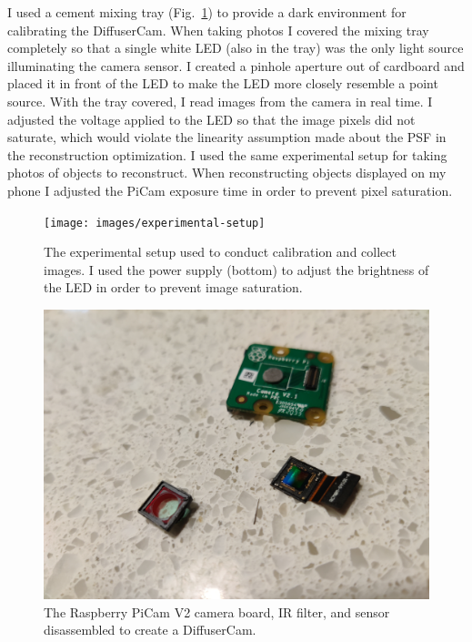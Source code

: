\documentclass[final]{cvpr}
\begin{document}
I used a cement mixing tray (Fig.~\ref{fig:experimental-setup}) to provide
a dark environment for calibrating the DiffuserCam.
When taking photos I covered the mixing tray completely so that a single white
LED (also in the tray) was the only light source illuminating the camera
sensor.
I created a pinhole aperture out of cardboard and placed it in front of the LED
to make the LED more closely resemble a point source.
With the tray covered, I read images from the camera in real time.
I adjusted the voltage applied to the LED so that the image pixels did not
saturate, which would violate the linearity assumption made about the PSF in
the reconstruction optimization.
I used the same experimental setup for taking photos of objects to reconstruct.
When reconstructing objects displayed on my phone I adjusted the PiCam exposure
time in order to prevent pixel saturation.


\begin{figure}[t]
	\centering
	\texttt{[image: images/experimental-setup]}
	\caption{\label{fig:experimental-setup}
		The experimental setup used to conduct calibration and collect images.
		I used the power supply (bottom) to adjust the brightness of the LED in order to prevent image saturation.}

\end{figure}



\begin{figure}[t]
	\centering
	\includegraphics[width=1.0\linewidth]{images/board-filter-sensor}
	\caption{\label{fig:board-filter-sensor}
		The Raspberry PiCam V2 camera board, IR filter, and sensor disassembled to create a DiffuserCam.}
\end{figure}
\end{document}
